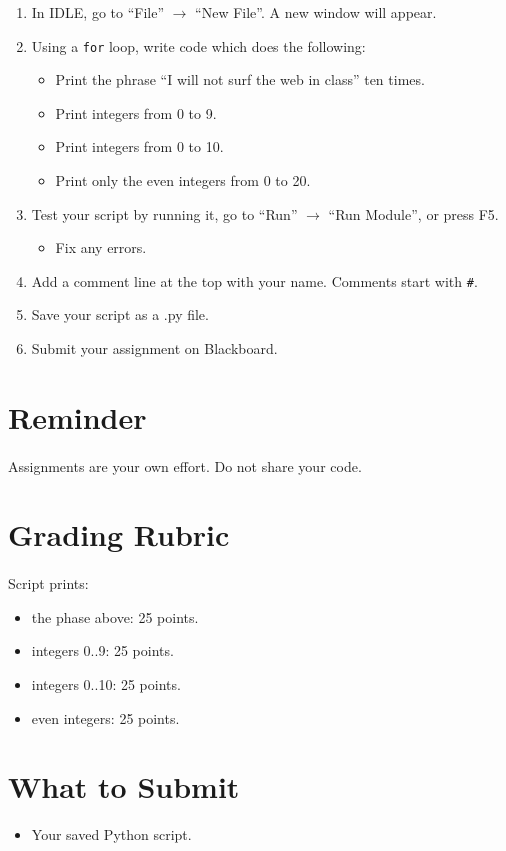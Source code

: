 \documentclass[letter,10pt]{article}
\begin{document}
    \begin{enumerate}
        \item In IDLE, go to ``File'' $\rightarrow$ ``New File''. A new window will appear.
        \item Using a \texttt{for} loop, write code which does the following:
        \begin{itemize}
            \item Print the phrase ``I will not surf the web in class'' ten times.
            \item Print integers from 0 to 9.
            \item Print integers from 0 to 10.
            \item Print only the even integers from 0 to 20.
        \end{itemize}
        \item Test your script by running it, go to ``Run'' $\rightarrow$ ``Run Module'', or press F5.
        \begin{itemize}
            \item Fix any errors.
        \end{itemize}
        \item Add a comment line at the top with your name. Comments start with \texttt{\#}.
        \item Save your script as a .py file.
        \item Submit your assignment on Blackboard.
    \end{enumerate}

    \section*{Reminder}
    \paragraph{}Assignments are your own effort. Do not share your code.

    \section*{Grading Rubric}
    \paragraph{}Script prints:
    \begin{itemize}
        \item the phase above: 25 points.
        \item integers 0..9: 25 points.
        \item integers 0..10: 25 points.
        \item even integers: 25 points.
    \end{itemize}
    
    \section*{What to Submit}
    \begin{itemize}
        \item Your saved Python script.
    \end{itemize}
    
\end{document}
